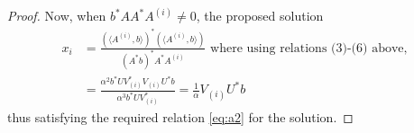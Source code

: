 \documentclass[10pt,a4paper]{amsart}
\begin{document}
\begin{proof}
Now, when $b^{*}AA^{*}A^{(i)} \neq 0$, the proposed solution
\begin{align*}
    x_i &= \frac{(\langle A^{(i)}, b\rangle)^*(\langle A^{(i)}, b\rangle)}{(A^{*}b)^{*}A^{*}A^{(i)}} \text{ where using relations (3)-(6) above,}\\
    &=\frac{\alpha^ 2b^*UV_{(i)}^{*}V_{(i)}U^{*}b}{\alpha^3 b^*UV_{(i)}^*}=\frac{1}{\alpha}V_{(i)}U^{*}b
\end{align*}
thus satisfying the required relation \eqref{eq:a2} for the solution.
\end{proof}
\end{document}
